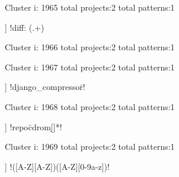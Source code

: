 Cluster i: 1965
total projects:2
total patterns:1
\begin{multicols}{1}
\begin{description}[noitemsep,topsep=0pt]
\item [[2] ] \cverb!diff: (.+)%
\end{description}
\end{multicols}







Cluster i: 1966
total projects:2
total patterns:1
\begin{multicols}{1}
\begin{description}[noitemsep,topsep=0pt]
\item [[2] ] \cverb!^\d+\.\d+\.\d+\.\d+$!
\end{description}
\end{multicols}







Cluster i: 1967
total projects:2
total patterns:1
\begin{multicols}{1}
\begin{description}[noitemsep,topsep=0pt]
\item [[2] ] \cverb!django_compressor\.!
\end{description}
\end{multicols}







Cluster i: 1968
total projects:2
total patterns:1
\begin{multicols}{1}
\begin{description}[noitemsep,topsep=0pt]
\item [[2] ] \cverb!repo\=cdrom[\:\w\d\/]*!
\end{description}
\end{multicols}







Cluster i: 1969
total projects:2
total patterns:1
\begin{multicols}{1}
\begin{description}[noitemsep,topsep=0pt]
\item [[2] ] \cverb!([A-Z][A-Z])([A-Z][0-9a-z])!
\end{description}
\end{multicols}







